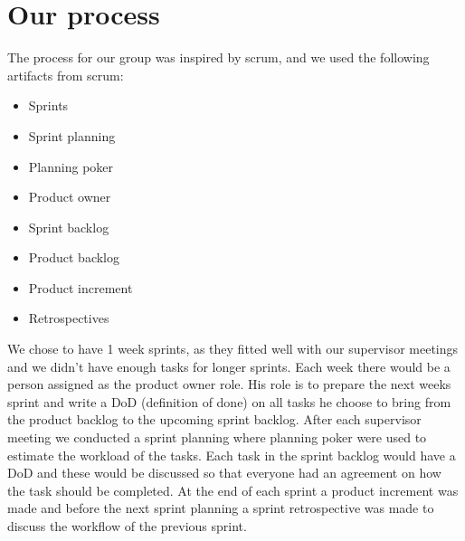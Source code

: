 \section{Our process}
The process for our group was inspired by scrum, and we used the following artifacts from scrum:

\begin{itemize}
    \item Sprints 
    \item Sprint planning 
    \item Planning poker 
    \item Product owner 
    \item Sprint backlog 
    \item Product backlog   
    \item Product increment 
    \item Retrospectives 
\end{itemize}

\noindent
We chose to have 1 week sprints, as they fitted well with our supervisor meetings and we didn't have enough tasks for longer sprints.
Each week there would be a person assigned as the product owner role.
His role is to prepare the next weeks sprint and write a DoD (definition of done) on all tasks he choose to bring from the product backlog to the upcoming sprint backlog.
After each supervisor meeting we conducted a sprint planning where planning poker were used to estimate the workload of the tasks.
Each task in the sprint backlog would have a DoD and these would be discussed so that everyone had an agreement on how the task should be completed.
At the end of each sprint a product increment was made and before the next sprint planning a sprint retrospective was made to discuss the workflow of the previous sprint.
